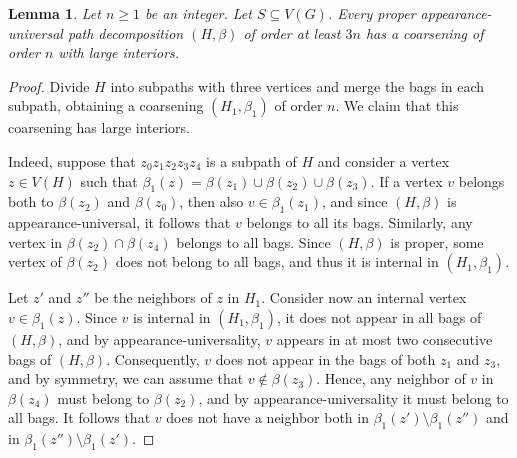 \documentclass[12pt]{article}
\newtheorem{lemma}[theorem]{Lemma}
\begin{document}
\begin{lemma}\label{lemma-lint}
Let $n\ge 1$ be an integer.  Let $S\subseteq V(G)$.  Every proper appearance-universal path decomposition $(H,\beta)$ of order at least $3n$
has a coarsening of order $n$ with large interiors.
\end{lemma}
\begin{proof} Divide $H$ into subpaths with three vertices and merge the bags
in each subpath, obtaining a coarsening $(H_1,\beta_1)$ of order $n$.  We claim that this coarsening has large interiors.

Indeed, suppose that $z_0z_1z_2z_3z_4$ is a subpath of $H$ and consider a vertex $z\in V(H)$ such that $\beta_1(z)=\beta(z_1)\cup \beta(z_2)\cup\beta(z_3)$.
If a vertex $v$ belongs both to $\beta(z_2)$ and $\beta(z_0)$, then also $v\in\beta_1(z_1)$, and since $(H,\beta)$ is appearance-universal,
it follows that $v$ belongs to all its bags.  Similarly, any vertex in $\beta(z_2)\cap\beta(z_4)$ belongs to all bags.  Since $(H,\beta)$ is proper,
some vertex of $\beta(z_2)$ does not belong to all bags, and thus it is internal in $(H_1,\beta_1)$.

Let $z'$ and $z''$ be the neighbors of $z$ in $H_1$.  Consider now an internal vertex $v\in \beta_1(z)$.
Since $v$ is internal in $(H_1,\beta_1)$, it does not appear in all bags of $(H,\beta)$, and by appearance-universality, $v$ appears in at most two consecutive bags of $(H,\beta)$.
Consequently, $v$ does not appear in the bags of both $z_1$ and $z_3$, and by symmetry, we can assume that $v\not\in\beta(z_3)$.
Hence, any neighbor of $v$ in $\beta(z_4)$ must belong to $\beta(z_2)$, and by appearance-universality it must belong to all bags.  It follows that $v$ does not have a neighbor both in
$\beta_1(z')\setminus\beta_1(z'')$ and in $\beta_1(z'')\setminus\beta_1(z')$.
\end{proof}
\end{document}
